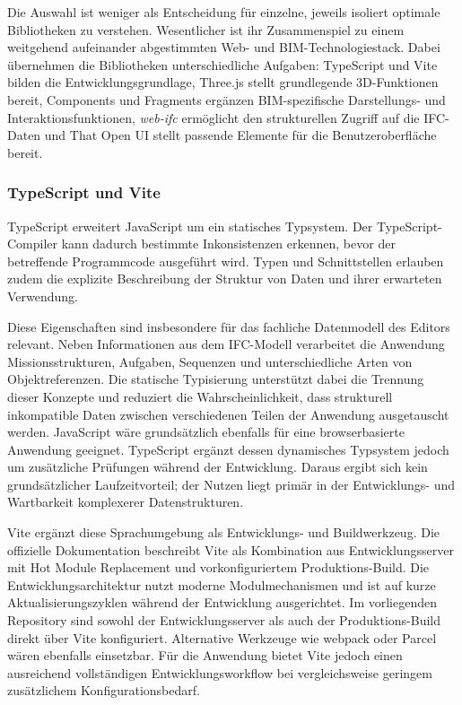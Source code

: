 Die Auswahl ist weniger als Entscheidung für einzelne, jeweils isoliert optimale Bibliotheken zu
verstehen. Wesentlicher ist ihr Zusammenspiel zu einem weitgehend aufeinander abgestimmten Web- und
BIM-Technologiestack. Dabei übernehmen die Bibliotheken unterschiedliche Aufgaben: TypeScript und
Vite bilden die Entwicklungsgrundlage, Three.js stellt grundlegende 3D-Funktionen bereit, Components
und Fragments ergänzen BIM-spezifische Darstellungs- und Interaktionsfunktionen, \textit{web-ifc}
ermöglicht den strukturellen Zugriff auf die IFC-Daten und That Open UI stellt passende Elemente für
die Benutzeroberfläche bereit.

\subsubsection{TypeScript und Vite}
TypeScript erweitert JavaScript um ein statisches Typsystem. Der TypeScript-Compiler kann dadurch
bestimmte Inkonsistenzen erkennen, bevor der betreffende Programmcode ausgeführt wird. Typen und
Schnittstellen erlauben zudem die explizite Beschreibung der Struktur von Daten und ihrer erwarteten
Verwendung.

Diese Eigenschaften sind insbesondere für das fachliche Datenmodell des Editors relevant. Neben
Informationen aus dem IFC-Modell verarbeitet die Anwendung Missionsstrukturen, Aufgaben, Sequenzen
und unterschiedliche Arten von Objektreferenzen. Die statische Typisierung unterstützt dabei die
Trennung dieser Konzepte und reduziert die Wahrscheinlichkeit, dass strukturell inkompatible Daten
zwischen verschiedenen Teilen der Anwendung ausgetauscht werden. JavaScript wäre grundsätzlich
ebenfalls für eine browserbasierte Anwendung geeignet. TypeScript ergänzt dessen dynamisches
Typsystem jedoch um zusätzliche Prüfungen während der Entwicklung. Daraus ergibt sich kein
grundsätzlicher Laufzeitvorteil; der Nutzen liegt primär in der Entwicklungs- und Wartbarkeit
komplexerer Datenstrukturen.

Vite ergänzt diese Sprachumgebung als Entwicklungs- und Buildwerkzeug. Die offizielle Dokumentation
beschreibt Vite als Kombination aus Entwicklungsserver mit Hot Module Replacement und
vorkonfiguriertem Produktions-Build. Die Entwicklungsarchitektur nutzt moderne Modulmechanismen und
ist auf kurze Aktualisierungszyklen während der Entwicklung ausgerichtet. Im vorliegenden Repository
sind sowohl der Entwicklungsserver als auch der Produktions-Build direkt über Vite konfiguriert.
Alternative Werkzeuge wie webpack oder Parcel wären ebenfalls einsetzbar. Für die Anwendung bietet
Vite jedoch einen ausreichend vollständigen Entwicklungsworkflow bei vergleichsweise geringem
zusätzlichem Konfigurationsbedarf.


